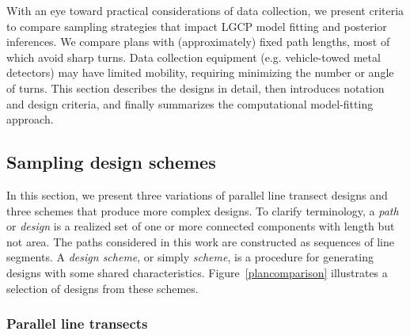 \documentclass[review]{elsarticle}
\begin{document}

With an eye toward practical considerations of data collection, we present
criteria to compare sampling strategies that impact LGCP model fitting and
posterior inferences. We compare plans with (approximately) fixed path lengths,
most of which avoid sharp turns. Data collection equipment (e.g. vehicle-towed
metal detectors) may have limited mobility, requiring minimizing the number or
angle of turns. This section describes the designs in detail, then introduces
notation and design criteria, and finally summarizes the computational
model-fitting approach.


\subsection{Sampling design schemes}
\label{methodschemes}

In this section, we present three variations of parallel line transect designs
and three schemes that produce more complex designs. To clarify terminology, a
\emph{path} or \emph{design} is a realized set of one or more connected
components with length but not area. The paths considered in this work are
constructed as sequences of line segments. A \emph{design scheme}, or simply
\emph{scheme}, is a procedure for generating designs with some shared
characteristics. Figure~\ref{plancomparison} illustrates a selection of designs
from these schemes.


\subsubsection{Parallel line transects}
\end{document}
